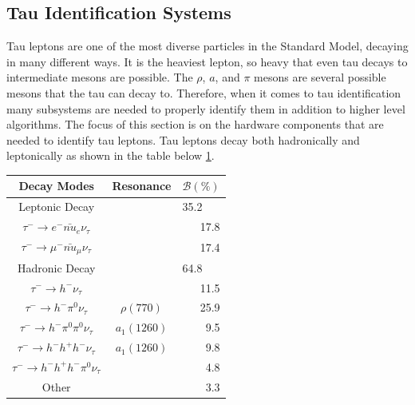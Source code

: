 

\subsection{Tau Identification Systems}
Tau leptons are one of the most diverse particles in the Standard Model, decaying in many different ways. It is the heaviest lepton, so heavy that even tau decays to intermediate mesons are possible. The $\rho$, $a$, and $\pi$ mesons are several possible mesons that the tau can decay to. Therefore, when it comes to tau identification many subsystems are needed to properly identify them in addition to higher level algorithms. The focus of this section is on the hardware components that are needed to identify tau leptons. Tau leptons decay both hadronically and leptonically as shown in the table below \ref{tab:taudecay}. 



\begin{table}[h!tbp]
\centering
\label{tab:taudecay}
\begin{tabular}{c  c r}
Decay Modes & Resonance & \multicolumn{1}{c}{$\mathcal{B}(\%)$} \\\hline
Leptonic Decay && \multicolumn{1}{l}{35.2}\\
$\tau^- \rightarrow e^- \bar{nu}_e \nu_\tau $ & & 17.8 \\
$\tau^- \rightarrow \mu^- \bar{nu}_\mu \nu_\tau$ & & 17.4 \\\hline
Hadronic Decay && \multicolumn{1}{l}{64.8}\\
$\tau^- \rightarrow h^-\nu_\tau$ & & 11.5 \\
$\tau^- \rightarrow h^-\pi^0 \nu_\tau$ & $\rho(770)$ & 25.9 \\
$\tau^- \rightarrow h^-\pi^0 \pi^0 \nu_\tau$ & $a_1(1260)$ & 9.5 \\
$\tau^- \rightarrow h^- h^+ h^- \nu_\tau$ & $a_1(1260)$ & 9.8 \\
$\tau^- \rightarrow h^- h^+ h^- \pi^0 \nu_\tau$ & & 4.8 \\
Other & & 3.3 \\\hline
\end{tabular}
\end{table}

